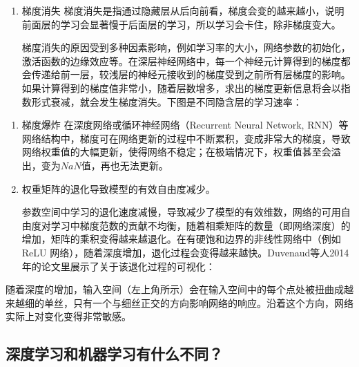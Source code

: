 \begin{enumerate}
\def\labelenumi{\arabic{enumi}.}
\item
  梯度消失
  梯度消失是指通过隐藏层从后向前看，梯度会变的越来越小，说明前面层的学习会显著慢于后面层的学习，所以学习会卡住，除非梯度变大。

  ​
  梯度消失的原因受到多种因素影响，例如学习率的大小，网络参数的初始化，激活函数的边缘效应等。在深层神经网络中，每一个神经元计算得到的梯度都会传递给前一层，较浅层的神经元接收到的梯度受到之前所有层梯度的影响。如果计算得到的梯度值非常小，随着层数增多，求出的梯度更新信息将会以指数形式衰减，就会发生梯度消失。下图是不同隐含层的学习速率：
\end{enumerate}

%  

\begin{enumerate}
\def\labelenumi{\arabic{enumi}.}
\setcounter{enumi}{1}
\item
  梯度爆炸 在深度网络或循环神经网络（Recurrent Neural Network,
  RNN）等网络结构中，梯度可在网络更新的过程中不断累积，变成非常大的梯度，导致网络权重值的大幅更新，使得网络不稳定；在极端情况下，权重值甚至会溢出，变为\(NaN\)值，再也无法更新。
\item
  权重矩阵的退化导致模型的有效自由度减少。

  ​
  参数空间中学习的退化速度减慢，导致减少了模型的有效维数，网络的可用自由度对学习中梯度范数的贡献不均衡，随着相乘矩阵的数量（即网络深度）的增加，矩阵的乘积变得越来越退化。在有硬饱和边界的非线性网络中（例如
  ReLU
  网络），随着深度增加，退化过程会变得越来越快。Duvenaud等人2014年的论文里展示了关于该退化过程的可视化：
\end{enumerate}

 

随着深度的增加，输入空间（左上角所示）会在输入空间中的每个点处被扭曲成越来越细的单丝，只有一个与细丝正交的方向影响网络的响应。沿着这个方向，网络实际上对变化变得非常敏感。

\subsection{深度学习和机器学习有什么不同？}\label{ux6df1ux5ea6ux5b66ux4e60ux548cux673aux5668ux5b66ux4e60ux6709ux4ec0ux4e48ux4e0dux540c}

